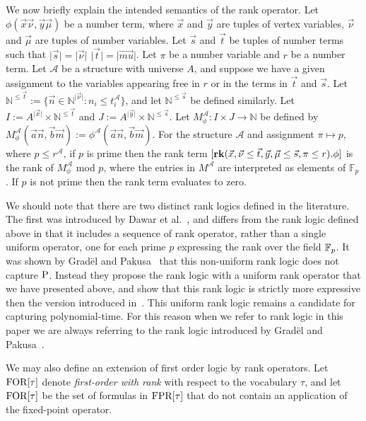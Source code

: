 \documentclass[../paper.tex]{subfiles}
\begin{document}
We now briefly explain the intended semantics of the rank operator. Let $\phi
(\vec{x} \vec {\nu}, \vec{y}\vec{\mu})$ be a number term, where $\vec{x}$ and
$\vec{y}$ are tuples of vertex variables, $\vec{\nu}$ and $\vec{\mu}$ are tuples
of number variables.  Let $\vec{s}$ and $\vec{t}$ be tuples of number terms such
that $\vert \vec{s} \vert = \vert \vec{\nu} \vert$ $\vert \vec{t}\vert = \vert
\vec{mu} \vert$. Let $\pi$ be a number variable and $r$ be a number
term.  Let
$\mathcal{A}$ be a structure with universe $A$, and suppose we have a given
assignment to the variables appearing free in $r$ or in the terms in
$\vec{t}$ and $\vec{s}$.  Let $\mathbb{N}^{\leq\vec{t}} := \{\vec{n} \in
\mathbb{N}^{\vert \vec{\nu} \vert}: n_i \leq t^{\mathcal{A}}_i\}$, and let
$\mathbb{N}^{\leq \vec{s}}$ be defined similarly.  Let $I:= A^{\vert \vec{x}
  \vert} \times \mathbb{N}^{\leq \vec{t}}$ and $J := A^{\vert \vec{y} \vert}
\times \mathbb{N}^{\leq \vec{s}}$.  Let $M^{\mathcal{A}}_\phi : I \times J
\rightarrow \mathbb{N}$ be defined by $M^{\mathcal{A}}_\phi (\vec{a}\vec{n},
\vec{b}\vec{m}):= \phi^{\mathcal{A}}(\vec{a}\vec{n},\vec{b}\vec{m})$. For the
structure $\mathcal{A}$ and assignment $\pi \mapsto p$, where $p \leq
r^{\mathcal{A}}$, if $p$ is prime then the rank term $[\text{\textbf{rk}} (\vec{x}, \vec
{\nu} \leq \vec{t}, \vec{y},\vec{\mu} \leq \vec{s}, \pi \leq r). \phi]$ is the
rank of $M^{\mathcal{A}}_\phi$ mod $p$, where the entries in $M^{\mathcal{A}}$
are interpreted as elements of $\mathbb{F}_p$. If $p$ is not prime then the rank
term evaluates to zero.

We should note that there are two distinct rank logics defined in the
literature. The first was introduced by Dawar et al.~\cite{Dawar09logicswith},
and differs from the rank logic defined above in that it includes a sequence of
rank operator, rather than a single uniform operator, one for each prime $p$
expressing the rank over the field $\mathbb{F}_p$. It was shown by Grad{\"e}l and
Pakusa~\cite{GradelP15a} that this non-uniform rank logic does not capture
$\mathrm{P}$.  Instead they propose the rank
logic with a uniform rank operator that we have presented above, and show that
this rank logic is strictly more expressive then the version
introduced in~\cite{Dawar09logicswith}.  This uniform rank logic remains a candidate for capturing
polynomial-time. For this reason when we refer to rank logic in this paper we
are always referring to the rank logic introduced by Grad{\"e}l and
Pakusa~\cite{GradelP15a}.

We may also define an extension of first order logic by rank operators. Let
$\text{\upshape FOR}[\tau]$ denote \emph{first-order with rank} with respect to the vocabulary
$\tau$, and let $\text{\upshape FOR}[\tau]$ be the set of formulas in $\text{\upshape FPR}[\tau]$ that do not
contain an application of the fixed-point operator.
\end{document}

